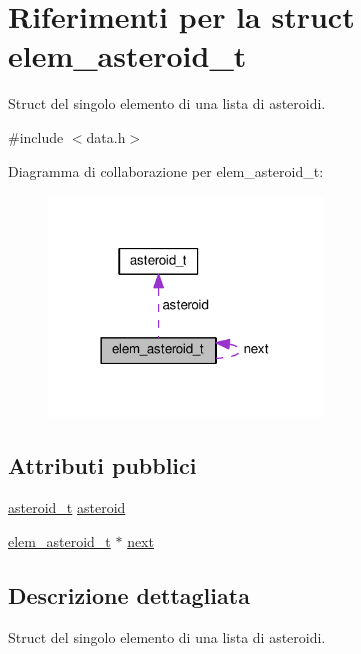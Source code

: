 \hypertarget{structelem__asteroid__t}{}\section{Riferimenti per la struct elem\+\_\+asteroid\+\_\+t}
\label{structelem__asteroid__t}


Struct del singolo elemento di una lista di asteroidi.  




{\ttfamily \#include $<$data.\+h$>$}



Diagramma di collaborazione per elem\+\_\+asteroid\+\_\+t\+:\nopagebreak
\begin{figure}[H]
\begin{center}
\leavevmode
\includegraphics[width=206pt]{d3/d7b/structelem__asteroid__t__coll__graph}
\end{center}
\end{figure}
\subsection*{Attributi pubblici}
\begin{DoxyCompactItemize}
\item 
\hyperlink{structasteroid__t}{asteroid\+\_\+t} \hyperlink{structelem__asteroid__t_aada6a67a7d9b0d76f5bc73b82feb1e2a}{asteroid}
\item 
\hyperlink{structelem__asteroid__t}{elem\+\_\+asteroid\+\_\+t} $\ast$ \hyperlink{structelem__asteroid__t_a5f906717abd1758a220cbb1c1e5e1c9d}{next}
\end{DoxyCompactItemize}


\subsection{Descrizione dettagliata}
Struct del singolo elemento di una lista di asteroidi. 

